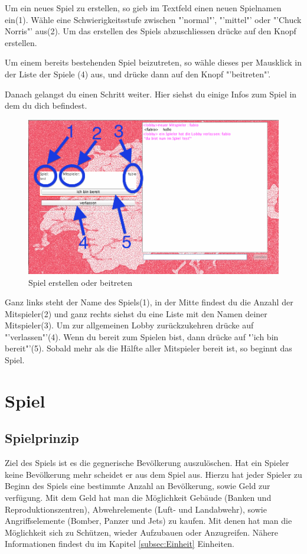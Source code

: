 \documentclass[ngerman, 12pt, pdftex]{scrartcl}[2006/07/30]
\begin{document}
Um ein neues Spiel zu erstellen, so gieb im Textfeld einen neuen Spielnamen ein(1).
W\"{a}hle eine Schwierigkeitsstufe zwischen "'normal"', "'mittel"' oder "'Chuck Norris"' aus(2).
Um das erstellen des Spiels abzuschliessen dr\"{u}cke auf den Knopf erstellen.

Um einem bereits bestehenden Spiel beizutreten, so w\"{a}hle dieses per Mausklick in der Liste der Spiele (4) aus, und dr\"{u}cke dann auf den Knopf "'beitreten"'.

Danach gelangst du einen Schritt weiter. Hier siehst du einige Infos zum Spiel in dem du dich befindest.

\begin{figure}[h]
\centering
\includegraphics[scale=0.3]{lobby/spielinfos.png}
\caption{Spiel erstellen oder beitreten}
\end{figure}

 Ganz links steht der Name des Spiels(1), in der Mitte findest du die Anzahl der Mitspieler(2) und ganz rechts siehst du eine Liste mit den Namen deiner Mitspieler(3).
Um zur allgemeinen Lobby zur\"{u}ckzukehren dr\"{u}cke auf "'verlassen"'(4).
Wenn du bereit zum Spielen bist, dann dr\"{u}cke auf "'ich bin bereit"'(5). Sobald mehr als die Hälfte aller Mitspieler bereit ist, so beginnt das Spiel.

\newpage

\section{Spiel}
\subsection{Spielprinzip}

Ziel des Spiels ist es die gegnerische Bevölkerung auszulöschen. Hat ein Spieler keine Bevölkerung mehr scheidet er aus dem Spiel aus.
Hierzu hat jeder Spieler zu Beginn des Spiels eine bestimmte Anzahl an Bevölkerung, sowie Geld zur verfügung.
Mit dem Geld hat man die Möglichkeit Gebäude (Banken und Reproduktionszentren), Abwehrelemente (Luft- und Landabwehr), sowie Angriffselemente (Bomber, Panzer und Jets) zu kaufen. Mit denen hat man die Möglichkeit sich zu Schützen, wieder Aufzubauen oder Anzugreifen. Nähere Informationen findest du im Kapitel \ref{subsec:Einheit} Einheiten.
\end{document}
